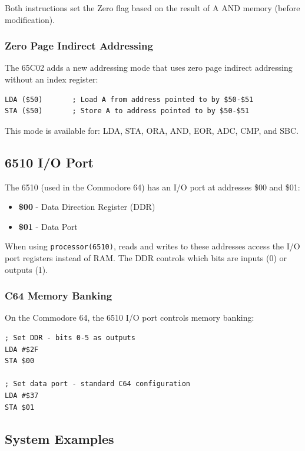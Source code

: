 \documentclass[11pt,letterpaper]{article}
\begin{document}
Both instructions set the Zero flag based on the result of A AND memory (before modification).

\subsubsection{Zero Page Indirect Addressing}

The 65C02 adds a new addressing mode that uses zero page indirect addressing without an index register:

\begin{verbatim}
LDA ($50)       ; Load A from address pointed to by $50-$51
STA ($50)       ; Store A to address pointed to by $50-$51
\end{verbatim}

This mode is available for: LDA, STA, ORA, AND, EOR, ADC, CMP, and SBC.

\subsection{6510 I/O Port}

The 6510 (used in the Commodore 64) has an I/O port at addresses \$00 and \$01:

\begin{itemize}
    \item \textbf{\$00} - Data Direction Register (DDR)
    \item \textbf{\$01} - Data Port
\end{itemize}

When using \texttt{processor(6510)}, reads and writes to these addresses access the I/O port registers instead of RAM. The DDR controls which bits are inputs (0) or outputs (1).

\subsubsection{C64 Memory Banking}

On the Commodore 64, the 6510 I/O port controls memory banking:

\begin{verbatim}
; Set DDR - bits 0-5 as outputs
LDA #$2F
STA $00

; Set data port - standard C64 configuration
LDA #$37
STA $01
\end{verbatim}

\subsection{System Examples}
\end{document}
